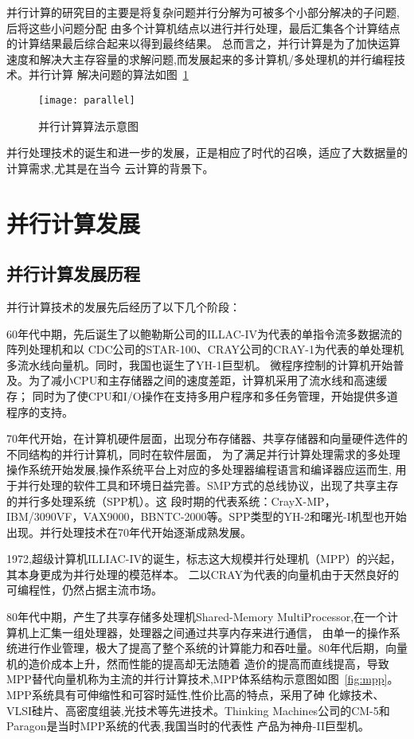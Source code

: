 并行计算的研究目的主要是将复杂问题并行分解为可被多个小部分解决的子问题,后将这些小问题分配
由多个计算机结点以进行并行处理，最后汇集各个计算结点的计算结果最后综合起来以得到最终结果。
总而言之，并行计算是为了加快运算速度和解决大主存容量的求解问题,而发展起来的多计算机/多处理机的并行编程技术。并行计算
解决问题的算法如图~\ref{fig:parallel}
    \begin{figure}[htbp]
    \centering
    \texttt{[image: parallel]}
    \caption{并行计算算法示意图}\label{fig:parallel}
    \vspace{\baselineskip}
    \end{figure}



并行处理技术的诞生和进一步的发展，正是相应了时代的召唤，适应了大数据量的计算需求,尤其是在当今
云计算的背景下。

\section{并行计算发展}
    
\subsection{并行计算发展历程}
并行计算技术的发展先后经历了以下几个阶段：

60年代中期，先后诞生了以鲍勒斯公司的ILLAC-IV为代表的单指令流多数据流的阵列处理机和以
CDC公司的STAR-100、CRAY公司的CRAY-1为代表的单处理机多流水线向量机。同时，我国也诞生了YH-1巨型机。
微程序控制的计算机开始普及。为了减小CPU和主存储器之间的速度差距，计算机采用了流水线和高速缓存；
同时为了使CPU和I/O操作在支持多用户程序和多任务管理，开始提供多道程序的支持。

70年代开始，在计算机硬件层面，出现分布存储器、共享存储器和向量硬件选件的不同结构的并行计算机，同时在软件层面，
为了满足并行计算处理需求的多处理操作系统开始发展,操作系统平台上对应的多处理器编程语言和编译器应运而生,
用于并行处理的软件工具和环境日益完善。SMP方式的总线协议，出现了共享主存的并行多处理系统（SPP机）。这
段时期的代表系统：CrayX-MP，IBM/3090VF，VAX9000，BBNTC-2000等。SPP类型的YH-2和曙光-I机型也开始
出现。并行处理技术在70年代开始逐渐成熟发展。

1972,超级计算机ILLIAC-IV的诞生，标志这大规模并行处理机（MPP）的兴起，其本身更成为并行处理的模范样本。
二以CRAY为代表的向量机由于天然良好的可编程性，仍然占据主流市场。 

 80年代中期，产生了共享存储多处理机Shared-Memory MultiProcessor,在一个计算机上汇集一组处理器，处理器之间通过共享内存来进行通信，
由单一的操作系统进行作业管理，极大了提高了整个系统的计算能力和吞吐量。80年代后期，向量机的造价成本上升，然而性能的提高却无法随着
造价的提高而直线提高，导致MPP替代向量机称为主流的并行计算技术,MPP体系结构示意图如图~\ref{fig:mpp}。MPP系统具有可伸缩性和可容时延性,性价比高的特点，采用了砷
化嫁技术、VLSI硅片、高密度组装,光技术等先进技术。Thinking Machines公司的CM-5和Paragon是当时MPP系统的代表,我国当时的代表性
产品为神舟-II巨型机。

